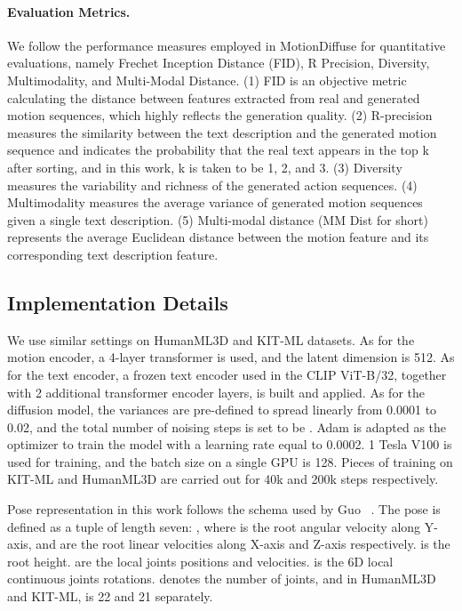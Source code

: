 \documentclass[10pt,twocolumn,letterpaper]{article}
\begin{document}
\paragraph{Evaluation Metrics.} We follow the performance measures employed in MotionDiffuse for quantitative evaluations, namely Frechet Inception Distance (FID), R Precision, Diversity, Multimodality, and Multi-Modal Distance. (1) FID is an objective metric calculating the distance between features extracted from real and generated motion sequences, which highly reflects the generation quality. (2) R-precision measures the similarity between the text description and the generated motion sequence and indicates the probability that the real text appears in the top k after sorting, and in this work, k is taken to be 1, 2, and 3. (3) Diversity measures the variability and richness of the generated action sequences. (4) Multimodality measures the average variance of generated motion sequences given a single text description. (5) Multi-modal distance (MM Dist for short) represents the average Euclidean distance between the motion feature and its corresponding text description feature.

\subsection{Implementation Details}

We use similar settings on HumanML3D and KIT-ML datasets. As for the motion encoder, a 4-layer transformer is used, and the latent dimension is 512. As for the text encoder, a frozen text encoder used in the CLIP ViT-B/32, together with 2 additional transformer encoder layers, is built and applied. As for the diffusion model, the variances  are pre-defined to spread linearly from 0.0001 to 0.02, and the total number of noising steps is set to be . Adam is adapted as the optimizer to train the model with a learning rate equal to 0.0002. 1 Tesla V100 is used for training, and the batch size on a single GPU is 128. Pieces of training on KIT-ML and HumanML3D are carried out for 40k and 200k steps respectively. \par
Pose representation in this work follows the schema used by Guo \etal~\cite{guo2022generating}. The pose is defined as a tuple of length seven: , where  is the root angular velocity along Y-axis, and  are the root linear velocities along X-axis and Z-axis respectively.  is the root height.  are the local joints positions and velocities.  is the 6D local continuous joints rotations.  denotes the number of joints, and in HumanML3D and KIT-ML,  is 22 and 21 separately.
\end{document}
